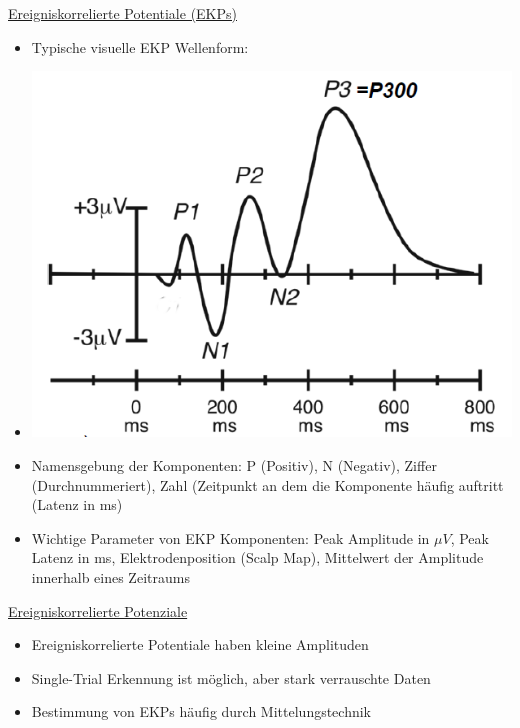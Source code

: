 \documentclass[a4paper,10pt,oneside]{article}
\begin{document}
\underline{Ereigniskorrelierte Potentiale (EKPs)} \\
	\begin{itemize}
		\item Typische visuelle EKP Wellenform:
		\item[] \includegraphics[scale=0.2]{Grafiken/1938.png}
		\item Namensgebung der Komponenten: P (Positiv), N (Negativ), Ziffer (Durchnummeriert), Zahl (Zeitpunkt an dem die Komponente häufig auftritt (Latenz in ms)
		\item Wichtige Parameter von EKP Komponenten: Peak Amplitude in $\mu V$, Peak Latenz in ms, Elektrodenposition (Scalp Map), Mittelwert der Amplitude innerhalb eines Zeitraums
	\end{itemize}
	
\underline{Ereigniskorrelierte Potenziale} \\ 
	\begin{itemize}
		\item Ereigniskorrelierte Potentiale haben kleine Amplituden
		\item Single-Trial Erkennung ist möglich, aber stark verrauschte Daten
		\item Bestimmung von EKPs häufig durch Mittelungstechnik
	\end{itemize}
\end{document}
